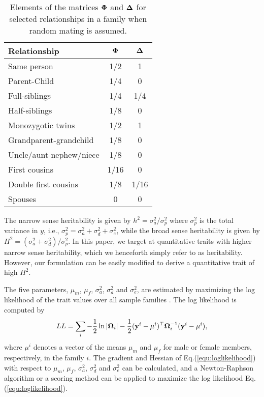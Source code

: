 \documentclass[10pt,letterpaper]{article}
\newcommand{\matrx}[1]{\ensuremath\boldsymbol{\rm #1}}
\newcommand{\vect}[1]{\ensuremath\boldsymbol{\rm #1}}
\begin{document}
\begin{table}[t]
\caption{Elements of the matrices $\matrx \Phi$ and $\matrx \Delta$ for selected relationships in a family when random mating is assumed.}
\label{tbl:kinship}
\vskip 0.15in
\begin{center}
\begin{small}

\begin{tabular}{lcc}
\hline
Relationship & $\matrx \Phi$ & $\matrx \Delta$  \\
\hline
Same person   & 1/2  &  1  \\
Parent-Child    & 1/4  &  0   \\
Full-siblings   & 1/4  &  1/4  \\
Half-siblings   & 1/8  &  0   \\
Monozygotic twins    &  1/2  &  1 \\
Grandparent-grandchild   &  1/8  &  0 \\
Uncle/aunt-nephew/niece   &  1/8  &  0 \\
First cousins   &  1/16  &  0 \\
Double first cousins   &  1/8  &  1/16 \\
Spouses    &  0  &  0 \\
\hline
\end{tabular}

\end{small}
\end{center}
\vskip -0.1in
\end{table}

The narrow sense heritability is given by $h^2=\sigma_a^2/\sigma_p^2$ where $\sigma_p^2$ is the total variance in $y$, i.e., $\sigma_p^2 = \sigma_a^2 + \sigma_d^2 + \sigma_e^2$, while the broad sense heritability is given by $H^2=(\sigma_a^2+\sigma_d^2)/\sigma_p^2$. In this paper, we target at quantitative traits with higher narrow sense heritability, which we henceforth simply refer to as heritability. However, our formulation can be easily modified to derive a quantitative trait of high $H^2$.

The five parameters, $\mu_m$, $\mu_f$, $\sigma_a^2$, $\sigma_d^2$ and $\sigma_e^2$, are estimated by maximizing the log likelihood of the trait values over all sample families \cite{Lange1976}. The log likelihood is computed by 
\begin{equation}
\label{equ:loglikelihood}
LL=\sum_i{-\frac{1}{2}\ln|\matrx \Omega_i| - \frac{1}{2}(\vect y^i-\mu^i)^\top \matrx \Omega_i^{-1}(\vect y^i-\mu^i)},
\end{equation}
where $\mu^i$ denotes a vector of the means $\mu_m$ and $\mu_f$ for male or female members, respectively, in the family $i$. The gradient and Hessian of Eq.(\ref{equ:loglikelihood}) with respect to $\mu_m$, $\mu_f$, $\sigma_a^2$, $\sigma_d^2$ and $\sigma_e^2$ can be calculated, and a Newton-Raphson algorithm or a scoring method \cite{Lange1976} can be applied to maximize the log likelihood Eq.(\ref{equ:loglikelihood}). 
\end{document}
